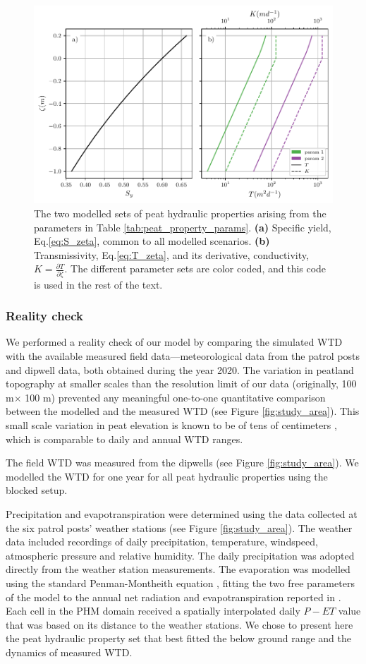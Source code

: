 \documentclass[bg, manuscript]{copernicus}
\begin{document}
\begin{figure}[t]
\includegraphics[width=8.3 cm]{figs/parameterization.pdf}
\caption{The two modelled sets of peat hydraulic properties arising from the parameters in Table \ref{tab:peat_property_params}. \textbf{(a)} Specific yield, Eq.\eqref{eq:S_zeta}, common to all modelled scenarios. \textbf{(b)} Transmissivity, Eq.\eqref{eq:T_zeta}, and its derivative, conductivity, $K = \frac{\partial T}{\partial \zeta}$. The different parameter sets are color coded, and this code is used in the rest of the text.}
\label{fig:parameterizatioe}
\end{figure}

\subsubsection{Reality check}
We performed a reality check of our model by comparing the simulated WTD with the available measured field data---meteorological data from the patrol posts and dipwell data, both obtained during the year 2020.
The variation in peatland topography at smaller scales than the resolution limit of our data (originally, 100 \unit{m}$\times$ 100 \unit{m}) prevented any meaningful one-to-one quantitative comparison between the modelled and the measured WTD (see Figure \ref{fig:study_area}).
This small scale variation in peat elevation is known to be of tens of centimeters \citep{lampelaGroundSurfaceMicrotopography2016, cobbHowTemporalPatterns2017}, which is comparable to daily and annual WTD ranges.

The field WTD was measured from the dipwells (see Figure \ref{fig:study_area}).
We modelled the  WTD for one year for all peat hydraulic properties using the blocked setup. 

Precipitation and evapotranspiration were determined using the data collected at the six patrol posts' weather stations (see Figure \ref{fig:study_area}).
The weather data included recordings of daily precipitation, temperature, windspeed, atmospheric pressure and relative humidity.
The daily precipitation was adopted directly from the weather station measurements.
The evaporation was modelled using the standard Penman-Montheith equation \citep{allenCropEvapotranspirationGuidelines1998}, fitting the two free parameters of the model to the annual net radiation and evapotranspiration reported in \citep{hiranoEvapotranspirationTropicalPeat2015}.
Each cell in the PHM domain received a spatially interpolated daily $P-ET$ value that was  based on its distance to the weather stations.
We chose to present here the peat hydraulic property set that best fitted the below ground range and the dynamics of measured WTD.
\end{document}

